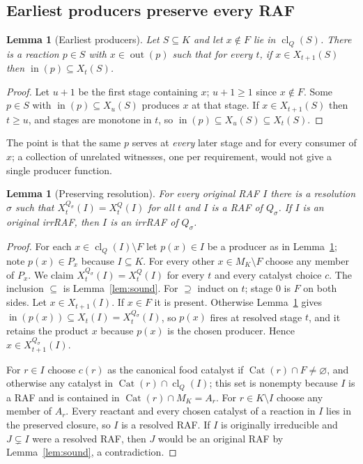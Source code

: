 \documentclass[11pt,a4paper]{article}
\theoremstyle{plain}
\newtheorem{lemma}[theorem]{Lemma}
\theoremstyle{definition}
\theoremstyle{remark}
\newcommand{\cl}{\operatorname{cl}}
\newcommand{\Cat}{\operatorname{Cat}}
\newcommand{\inp}{\operatorname{in}}
\newcommand{\out}{\operatorname{out}}
\begin{document}
\subsection{Earliest producers preserve every RAF}

\begin{lemma}[Earliest producers]\label{lem:earliest}
Let $S\subseteq K$ and let $x\notin F$ lie in $\cl_Q(S)$. There is a reaction $p\in S$ with $x\in\out(p)$ such that for every $t$, if $x\in X_{t+1}(S)$ then $\inp(p)\subseteq X_t(S)$.
\end{lemma}
\begin{proof}
Let $u+1$ be the first stage containing $x$; $u+1\ge1$ since $x\notin F$. Some $p\in S$ with $\inp(p)\subseteq X_u(S)$ produces $x$ at that stage. If $x\in X_{t+1}(S)$ then $t\ge u$, and stages are monotone in $t$, so $\inp(p)\subseteq X_u(S)\subseteq X_t(S)$.
\end{proof}

The point is that the same $p$ serves at \emph{every} later stage and for every consumer of $x$; a collection of unrelated witnesses, one per requirement, would not give a single producer function.

\begin{lemma}[Preserving resolution]\label{lem:preserve}
For every original RAF $I$ there is a resolution $\sigma$ such that $X_t^{Q_\sigma}(I)=X_t^{Q}(I)$ for all $t$ and $I$ is a RAF of $Q_\sigma$. If $I$ is an original irrRAF, then $I$ is an irrRAF of $Q_\sigma$.
\end{lemma}
\begin{proof}
For each $x\in\cl_Q(I)\setminus F$ let $p(x)\in I$ be a producer as in Lemma~\ref{lem:earliest}; note $p(x)\in P_x$ because $I\subseteq K$. For every other $x\in M_K\setminus F$ choose any member of $P_x$. We claim $X_t^{Q_\sigma}(I)=X_t^{Q}(I)$ for every $t$ and every catalyst choice $c$. The inclusion $\subseteq$ is Lemma~\ref{lem:sound}. For $\supseteq$ induct on $t$; stage $0$ is $F$ on both sides. Let $x\in X_{t+1}(I)$. If $x\in F$ it is present. Otherwise Lemma~\ref{lem:earliest} gives $\inp(p(x))\subseteq X_t(I)=X_t^{Q_\sigma}(I)$, so $p(x)$ fires at resolved stage $t$, and it retains the product $x$ because $p(x)$ is the chosen producer. Hence $x\in X_{t+1}^{Q_\sigma}(I)$.

For $r\in I$ choose $c(r)$ as the canonical food catalyst if $\Cat(r)\cap F\ne\varnothing$, and otherwise any catalyst in $\Cat(r)\cap\cl_Q(I)$; this set is nonempty because $I$ is a RAF and is contained in $\Cat(r)\cap M_K=A_r$. For $r\in K\setminus I$ choose any member of $A_r$. Every reactant and every chosen catalyst of a reaction in $I$ lies in the preserved closure, so $I$ is a resolved RAF. If $I$ is originally irreducible and $J\subsetneq I$ were a resolved RAF, then $J$ would be an original RAF by Lemma~\ref{lem:sound}, a contradiction.
\end{proof}
\end{document}
